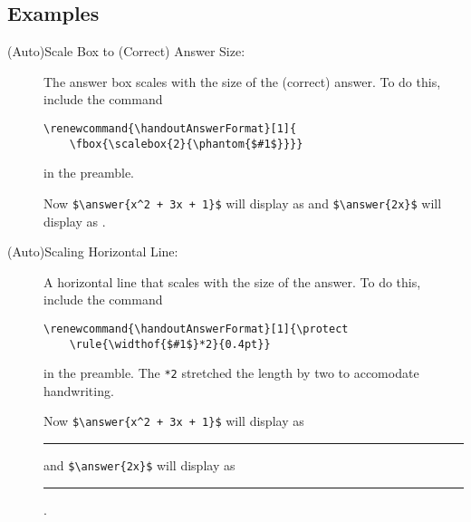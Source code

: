\documentclass{ximera}
\begin{document}
    \subsection*{Examples}
        \begin{description}
            \item[(Auto)Scale Box to (Correct) Answer Size:] The answer box scales with the size of the (correct) answer. To do this, include the command 
            \begin{verbatim}
\renewcommand{\handoutAnswerFormat}[1]{
    \fbox{\scalebox{2}{\phantom{$#1$}}}}
            \end{verbatim}
            in the preamble. 
            
            Now \verb|$\answer{x^2 + 3x + 1}$| will display as \fbox{\scalebox{2}{\phantom{$x^2 + 3x + 1$}}} and \verb|$\answer{2x}$| will display as \fbox{\scalebox{2}{\phantom{$2x$}}}.
                
            \item[(Auto)Scaling Horizontal Line:] A horizontal line that scales with the size of the answer. To do this, include the command 
            \begin{verbatim}
\renewcommand{\handoutAnswerFormat}[1]{\protect
    \rule{\widthof{$#1$}*2}{0.4pt}}
            \end{verbatim}
            in the preamble. The \verb|*2| stretched the length by two to accomodate handwriting.

            Now \verb|$\answer{x^2 + 3x + 1}$| will display as
            \rule{*2}{0.4pt} and \verb|$\answer{2x}$| will display as \rule{*2}{0.4pt}.



        \end{description}
    
                

    
\end{document}
